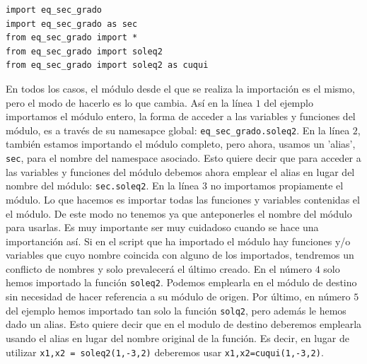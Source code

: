 \begin{verbatim}
import eq_sec_grado
import eq_sec_grado as sec
from eq_sec_grado import *
from eq_sec_grado import soleq2
from eq_sec_grado import soleq2 as cuqui
\end{verbatim}

\begin{paracol}{2}
En todos los casos, el módulo desde el que se realiza la importación es el mismo, pero el modo de hacerlo es lo que cambia. Así en la línea $1$ del ejemplo importamos el módulo entero, la forma de acceder a las variables y funciones del módulo, es a través de su namesapce global: \texttt{eq_sec_grado.soleq2}. En la línea $2$, también estamos importando el módulo completo, pero ahora, usamos un 'alias', \texttt{sec},  para el nombre del namespace asociado. Esto quiere decir que para acceder a las variables y funciones del módulo debemos ahora emplear el alias en lugar del nombre del módulo: \texttt{sec.soleq2}. En la línea $3$ no importamos propiamente el módulo. Lo que hacemos es importar todas las funciones y variables contenidas el el módulo. De este modo no tenemos ya que anteponerles el nombre del módulo para usarlas. Es muy importante ser muy cuidadoso cuando se hace una importanción así. Si en el script que ha importado el módulo hay funciones y/o variables que cuyo nombre coincida con alguno de los importados, tendremos un conflicto de nombres y solo prevalecerá el último creado. En el número $4$ solo hemos importado la función \texttt{soleq2}. Podemos emplearla en el módulo de destino sin necesidad de hacer referencia a su módulo de origen. Por último, en número $5$ del ejemplo hemos importado tan solo la función \texttt{solq2}, pero además le hemos dado un alias. Esto quiere decir que en el modulo de destino deberemos emplearla usando el alias en lugar del nombre original de la función. Es decir, en lugar de utilizar \texttt{x1,x2 = soleq2(1,-3,2)} deberemos usar \texttt{x1,x2=cuqui(1,-3,2)}.
\switchcolumn

\end{paracol}
